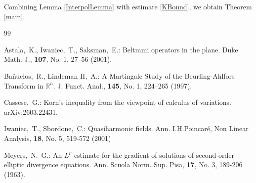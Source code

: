 \documentclass[12pt,reqno]{amsart}
\newcommand{\R}{{\mathbb R}}
\begin{document}
Combining Lemma \ref{InterpolLemma} with estimate \eqref{KBound}, we obtain Theorem \ref{main}.
\begin{thebibliography}{99}

 Astala,~K., Iwaniec,~T., Saksman,~E.:
\newblock Beltrami operators in the plane.
\newblock Duke Math. J., \textbf{107}, No. 1, 27--56 (2001).

 Ba\~nuelos,~R., Lindeman II,~A.:
\newblock A Martingale Study of the Beurling-Ahlfors Transform in $\R^n$.
\newblock J. Funct. Anal., \textbf{145}, No. 1, 224--265 (1997).

 Cassese,~G.:
\newblock Korn's inequality from the viewpoint of calculus of variations.
\newblock arXiv:2603.22431.

 Iwaniec,~T., Sbordone,~C.:
\newblock Quasiharmonic fields.
\newblock Ann. I.H.Poincar\'e, Non Linear Analysis, \textbf{18}, No. 5, 519-572 (2001)

 Meyers,~N.~G.:
\newblock An {$L^{p}$}-estimate for the gradient of solutions of second-order elliptic divergence equations.
\newblock Ann. Scuola Norm. Sup. Pisa, \textbf{17}, No. 3, 189-206 (1963).

\end{thebibliography}
\end{document}
